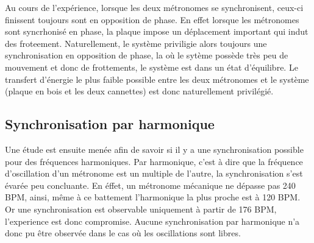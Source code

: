 \documentclass[a4paper,11pt]{report}
\begin{document}
Au cours de l'expérience, lorsque les deux métronomes se synchronisent, ceux-ci finissent toujours sont en opposition de phase. En effet lorsque les métronomes sont syncrhonisé en phase, la plaque impose un  déplacement important qui indut des froteement. Naturellement, le système priviligie alors toujours une synchronisation en opposition de phase, la où le sytème possède très peu de mouvement et donc de frottements, le système est dans un état d'équilibre. Le transfert d'énergie le plus faible possible entre les deux métronomes et le système (plaque en bois et les deux cannettes) est donc naturellement privilégié.	

\subsection{Synchronisation par harmonique}
Une étude est ensuite menée afin de savoir si il y a une synchronisation possible pour des fréquences harmoniques. Par harmonique, c'est à dire que la fréquence d'oscillation d'un métronome est un multiple de l'autre, la synchronisation s'est évarée peu concluante. En éffet, un métronome mécanique ne dépasse pas 240 BPM, ainsi, même à ce battement l'harmonique la plus proche est à 120 BPM. Or une synchronisation est observable uniquement à partir de 176 BPM, l'experience est donc compromise. Aucune synchronisation par harmonique n'a donc pu être observée dans le cas où les oscillations sont libres.
\end{document}

